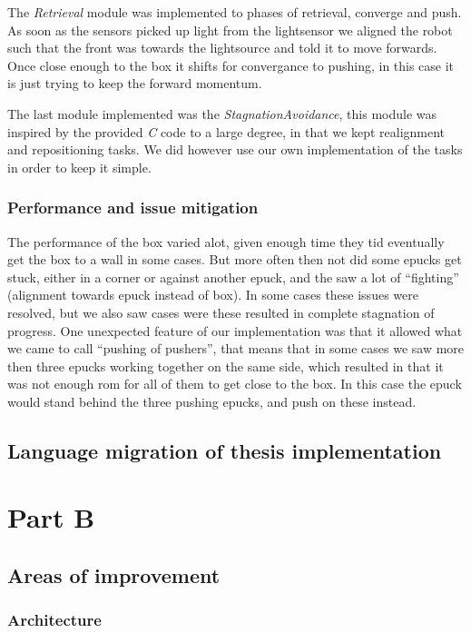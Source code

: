 \documentclass[12pt]{article}
\newcommand{\shiftline}[0]{\hfill\newline\noindent}
\begin{document}
		\shiftline The \textit{Retrieval} module was implemented to phases of retrieval, converge and push. 
			As soon as the sensors picked up light from the lightsensor we aligned the robot such that the front was towards the lightsource and told it to move forwards. 
			Once close enough to the box it shifts for convergance to pushing, in this case it is just trying to keep the forward momentum.
	
		\shiftline The last module implemented was the \textit{StagnationAvoidance}, this module was inspired by the provided \textit{C} code to a large degree, 
		in that we kept realignment and repositioning tasks. 
		We did however use our own implementation of the tasks in order to keep it simple. 
			
		\subsubsection{Performance and issue mitigation}
			The performance of the box varied alot, given enough time they tid eventually get the box to a wall in some cases. But more often then not did some epucks get stuck, 
			either in a corner or against another epuck, and the saw a lot of ``fighting'' (alignment towards epuck instead of box). In some cases these issues were resolved, 
			but we also saw cases were these resulted in complete stagnation of progress. 
			One unexpected feature of our implementation was that it allowed what we came to call "`pushing of pushers"', that means that in some cases we saw more then three 
			epucks working together on the same side, which resulted in that it was not enough rom for all of them to get close to the box. In this case the epuck would stand behind
			the three pushing epucks, and push on these instead. 
		
	\subsection{Language migration of thesis implementation}
		

\section{Part B}
	\subsection{Areas of improvement}
		\subsubsection{Architecture}
\end{document}
